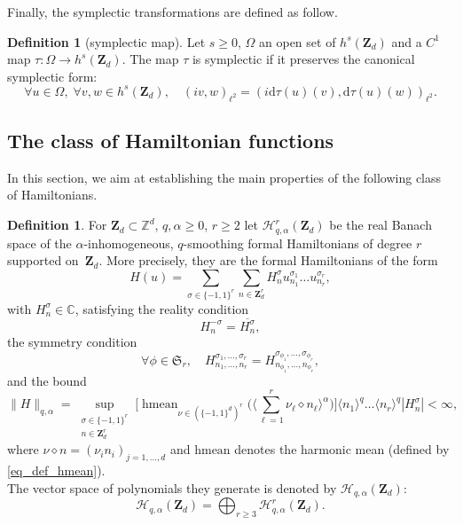 \documentclass[JEP,XML,SOM,Unicode,NoEqCountersInSection,published]{cedram}
\theoremstyle{definition}
\newtheorem{definition}[theorem]{Definition}
\begin{document}
Finally, the symplectic transformations are defined as follow.
\begin{definition}[symplectic map]
\label{def_symplectic} Let $s\geq 0$, $\Omega$ an open set of $h^s(\mathbf{Z}_d)$ and a $C^1$ map $\tau: \Omega \to h^s(\mathbf{Z}_d) $. The map $\tau$ is symplectic if it preserves the canonical symplectic form:
\[
\forall u \in \Omega,\; \forall v,w \in h^s(\mathbf{Z}_d), \quad (iv,w)_{\ell^2} = (i\mathrm{d}\tau(u)(v),\mathrm{d}\tau(u)(w))_{\ell^2}.
\]
\end{definition}

\subsection{The class of Hamiltonian functions}
In this section, we aim at establishing the main properties of the following class of Hamiltonians.
\begin{definition}
\label{def_class_ham} For $\mathbf{Z}_d\subset \mathbb{Z}^d$, $q,\alpha\geq 0$, $r\geq 2$ let $\mathscr{H}_{q,\alpha}^{r}(\mathbf{Z}_d)$ be the real Banach space of the $\alpha$-inhomogeneous, $q$-smoothing formal Hamiltonians of degree $r$ supported on~$\mathbf{Z}_d$. More precisely, they are the formal Hamiltonians of the form
\[
H(u) = \sum_{\sigma \in \{-1,1\}^r} \sum_{n\in \mathbf{Z}_d^r } H_{n}^{\sigma} u_{n_1}^{\sigma_1} \dots u_{n_r}^{\sigma_r},
\]
with $H_{n}^{\sigma} \in \mathbb{C}$, satisfying the reality condition
\begin{equation}
\label{eq_def_real}
H_{n}^{-\sigma} = \overline{H_{n}^{\sigma}},
\end{equation}
the symmetry condition\vspace*{-3pt}
\begin{equation}
\label{def_sym_cond}
\forall \phi \in \mathfrak{S}_r, \quad H_{n_1,\dots,n_r}^{\sigma_1,\dots,\sigma_r} = H_{n_{\phi_1},\dots,n_{\phi_r}}^{\sigma_{\phi_1},\dots,\sigma_{\phi_r}},
\end{equation}
and the bound\vspace*{-3pt}
\begin{equation}
\label{eq_norm_ham}
\| H \|_{q,\alpha} = \! \! \! \sup_{\substack{\sigma \in \{-1,1\}^r\\ n\in \mathbf{Z}_d^r }}
\biggl[\mathop{\mathrm{hmean}}_{\nu \in (\{-1,1\}^d)^r} \Big(\Big\langle \sum_{\ell =1}^r \nu_{\ell} \diamond n_{\ell} \Big\rangle^{\alpha} \Big) \biggr] \langle n_1 \rangle^q \dots \langle n_r \rangle^q | H_{n}^{\sigma} | < \infty,
\end{equation}
where $\nu \diamond n =(\nu_i n_i)_{j=1,\dots,d}$ and $\mathrm{hmean}$ denotes the harmonic mean (defined by \eqref{eq_def_hmean}).\\
The vector space of polynomials they generate is denoted by $\mathscr{H}_{q,\alpha}(\mathbf{Z}_d)$:
\[
\mathscr{H}_{q,\alpha}(\mathbf{Z}_d) = \bigoplus_{r \geq 3} \mathscr{H}_{q,\alpha}^{r}(\mathbf{Z}_d).
\]
\end{definition}
\end{document}

